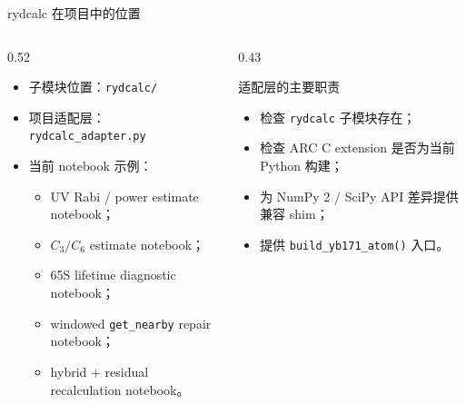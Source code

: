 \documentclass[aspectratio=169,11pt]{ctexbeamer}
\begin{document}
\begin{frame}{rydcalc 在项目中的位置}
  \begin{columns}[T]
    \begin{column}{0.52\textwidth}
      \begin{itemize}
        \item 子模块位置：\texttt{rydcalc/}
        \item 项目适配层：\texttt{rydcalc\_adapter.py}
        \item 当前 notebook 示例：
          \begin{itemize}
            \item UV Rabi / power estimate notebook；
            \item \(C_3/C_6\) estimate notebook；
            \item 65S lifetime diagnostic notebook；
            \item windowed \texttt{get\_nearby} repair notebook；
            \item hybrid + residual recalculation notebook。
          \end{itemize}
      \end{itemize}
    \end{column}
    \begin{column}{0.43\textwidth}
      \begin{block}{适配层的主要职责}
        \begin{itemize}
          \item 检查 \texttt{rydcalc} 子模块存在；
          \item 检查 ARC C extension 是否为当前 Python 构建；
          \item 为 NumPy 2 / SciPy API 差异提供兼容 shim；
          \item 提供 \texttt{build\_yb171\_atom()} 入口。
        \end{itemize}
      \end{block}
    \end{column}
  \end{columns}
\end{frame}
\end{document}
